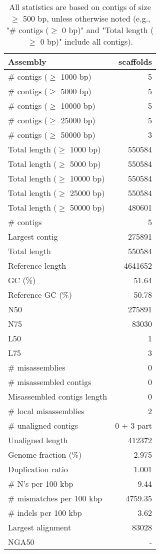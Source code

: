 \documentclass[12pt,a4paper]{article}
\begin{document}
\begin{table}[ht]
\begin{center}
\caption{All statistics are based on contigs of size $\geq$ 500 bp, unless otherwise noted (e.g., "\# contigs ($\geq$ 0 bp)" and "Total length ($\geq$ 0 bp)" include all contigs).}
\begin{tabular}{|l*{1}{|r}|}
\hline
Assembly & scaffolds \\ \hline
\# contigs ($\geq$ 1000 bp) & 5 \\ \hline
\# contigs ($\geq$ 5000 bp) & 5 \\ \hline
\# contigs ($\geq$ 10000 bp) & 5 \\ \hline
\# contigs ($\geq$ 25000 bp) & 5 \\ \hline
\# contigs ($\geq$ 50000 bp) & 3 \\ \hline
Total length ($\geq$ 1000 bp) & 550584 \\ \hline
Total length ($\geq$ 5000 bp) & 550584 \\ \hline
Total length ($\geq$ 10000 bp) & 550584 \\ \hline
Total length ($\geq$ 25000 bp) & 550584 \\ \hline
Total length ($\geq$ 50000 bp) & 480601 \\ \hline
\# contigs & 5 \\ \hline
Largest contig & 275891 \\ \hline
Total length & 550584 \\ \hline
Reference length & 4641652 \\ \hline
GC (\%) & 51.64 \\ \hline
Reference GC (\%) & 50.78 \\ \hline
N50 & 275891 \\ \hline
N75 & 83030 \\ \hline
L50 & 1 \\ \hline
L75 & 3 \\ \hline
\# misassemblies & 0 \\ \hline
\# misassembled contigs & 0 \\ \hline
Misassembled contigs length & 0 \\ \hline
\# local misassemblies & 2 \\ \hline
\# unaligned contigs & 0 + 3 part \\ \hline
Unaligned length & 412372 \\ \hline
Genome fraction (\%) & 2.975 \\ \hline
Duplication ratio & 1.001 \\ \hline
\# N's per 100 kbp & 9.44 \\ \hline
\# mismatches per 100 kbp & 4759.35 \\ \hline
\# indels per 100 kbp & 3.62 \\ \hline
Largest alignment & 83028 \\ \hline
NGA50 & - \\ \hline
\end{tabular}
\end{center}
\end{table}
\end{document}
